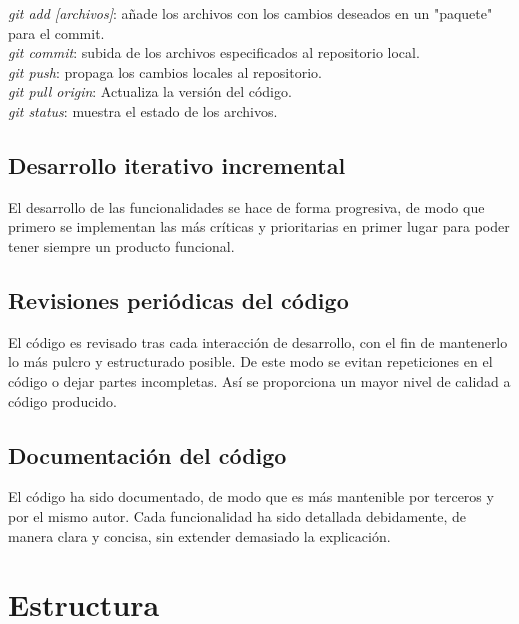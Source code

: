 \textit{git add [archivos]}: añade los archivos con los cambios deseados en un "paquete" para el commit.\\


\textit{git commit}: subida de los archivos especificados al repositorio local.\\


\textit{git push}: propaga los cambios locales al repositorio.\\


\textit{git pull origin}: Actualiza la versión del código.\\


\textit{git status}: muestra el estado de los archivos.\\


\bigskip
\subsection{Desarrollo iterativo incremental}
\bigskip

El desarrollo de las funcionalidades se hace de forma progresiva, de modo que primero se implementan las más críticas y prioritarias en primer lugar para poder tener siempre un producto funcional.

\bigskip
\subsection{Revisiones periódicas del código}
\bigskip

El código es revisado tras cada interacción de desarrollo, con el fin de mantenerlo lo más pulcro y estructurado posible. De este modo se evitan repeticiones en el código o dejar partes incompletas. Así se proporciona un mayor nivel de calidad a código producido.

\bigskip
\subsection{Documentación del código}
\bigskip

El código ha sido documentado, de modo que es más mantenible por terceros y por el mismo autor. Cada funcionalidad ha sido detallada debidamente, de manera clara y concisa, sin extender demasiado la explicación.




\newpage
\section{Estructura}

